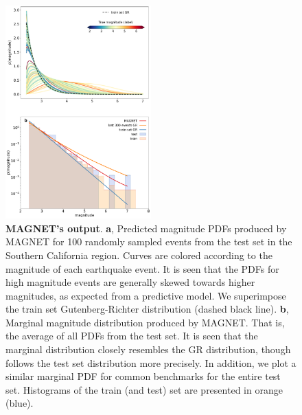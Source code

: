 \documentclass[pdflatex]{sn-jnl}
\begin{document}
\begin{figure}[h!]
    \centering
    \includegraphics[width=0.5\textwidth]{figures/raw_results.pdf}
    \caption{
        \textbf{MAGNET's output}. \textbf{a}, Predicted magnitude PDFs produced by MAGNET for 100 randomly sampled events from the test set in the Southern California region. Curves are colored according to the magnitude of each earthquake event. It is seen that the PDFs for high magnitude events are generally skewed towards higher magnitudes, as expected from a predictive model. We superimpose the train set Gutenberg-Richter distribution (dashed black line).  \textbf{b}, Marginal magnitude distribution produced by MAGNET. That is, the average of all PDFs from the test set. It is seen that the marginal distribution closely resembles the GR distribution, though follows the test set distribution more precisely. In addition, we plot a similar marginal PDF for common benchmarks for the entire test set. Histograms of the train (and test) set are presented in orange (blue).
    }
    \label{fig:model_output}
\end{figure}
\end{document}
